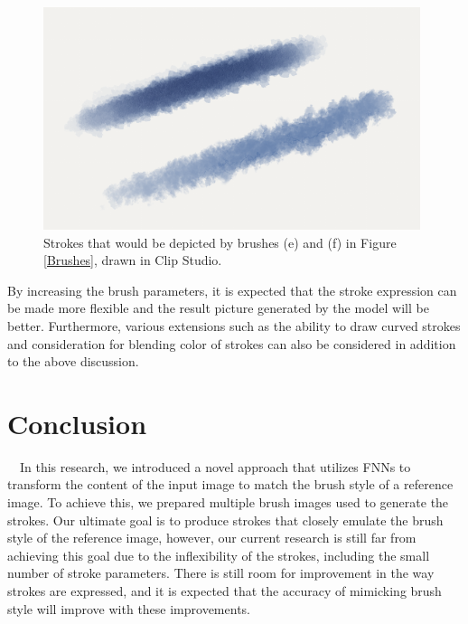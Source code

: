 \begin{figure}[h]
    \centering
    \includegraphics[width=100truemm]{resources/6_discussions/coral_cloud.png}
    \caption{
        Strokes that would be depicted by brushes (e) and (f) in Figure \ref{Brushes},
        drawn in Clip Studio.
    }
    \label{stroke-shouldbe}
\end{figure}


By increasing the brush parameters, it is expected that the stroke expression 
can be made more flexible and the result picture generated by the model will 
be better.
Furthermore, various extensions such as the ability to draw curved strokes and 
consideration for blending color of strokes can also be considered in addition 
to the above discussion.

\section{Conclusion}
　In this research, we introduced a novel approach that utilizes FNNs to 
transform the content of the input image to match the brush style of a 
reference image.
To achieve this, we prepared multiple brush images used to generate the strokes.
Our ultimate goal is to produce strokes that closely emulate the brush style of 
the reference image, however, our current research is still far from achieving 
this goal due to the inflexibility of the strokes, including the small number 
of stroke parameters. There is still room for improvement in the way strokes 
are expressed, and it is expected that the accuracy of mimicking brush style 
will improve with these improvements.